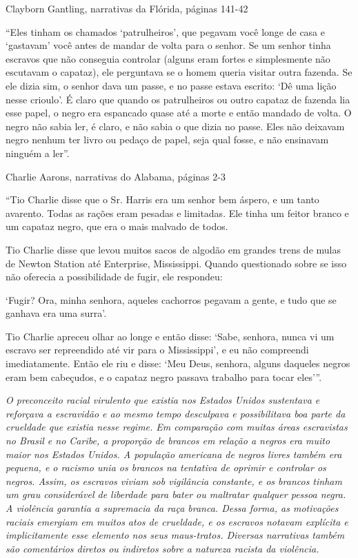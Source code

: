 Clayborn Gantling, narrativas da Flórida, páginas 141-42

``Eles tinham os chamados `patrulheiros', que pegavam você longe de casa
e `gastavam' você antes de mandar de volta para o senhor. Se um senhor
tinha escravos que não conseguia controlar (alguns eram fortes e
simplesmente não escutavam o capataz), ele perguntava se o homem queria
visitar outra fazenda. Se ele dizia sim, o senhor dava um passe, e no
passe estava escrito: `Dê uma lição nesse crioulo'. É claro que quando
os patrulheiros ou outro capataz de fazenda lia esse papel, o negro era
espancado quase até a morte e então mandado de volta. O negro não sabia
ler, é claro, e não sabia o que dizia no passe. Eles não deixavam negro
nenhum ter livro ou pedaço de papel, seja qual fosse, e não ensinavam
ninguém a ler''.

Charlie Aarons, narrativas do Alabama, páginas 2-3

``Tio Charlie disse que o Sr. Harris era um senhor bem áspero, e um
tanto avarento. Todas as rações eram pesadas e limitadas. Ele tinha um
feitor branco e um capataz negro, que era o mais malvado de todos.

Tio Charlie disse que levou muitos sacos de algodão em grandes trens de
mulas de Newton Station até Enterprise, Mississippi. Quando questionado
sobre se isso não oferecia a possibilidade de fugir, ele respondeu:

`Fugir? Ora, minha senhora, aqueles cachorros pegavam a gente, e tudo
que se ganhava era uma surra'.

Tio Charlie apreceu olhar ao longe e então disse: `Sabe, senhora, nunca
vi um escravo ser repreendido até vir para o Mississippi', e eu não
compreendi imediatamente. Então ele riu e disse: `Meu Deus, senhora,
alguns daqueles negros eram bem cabeçudos, e o capataz negro passava
trabalho para tocar eles'''.

\emph{O preconceito racial virulento que existia nos Estados Unidos
sustentava e reforçava a escravidão e ao mesmo tempo desculpava e
possibilitava boa parte da crueldade que existia nesse regime. Em
comparação com muitas áreas escravistas no Brasil e no Caribe, a
proporção de brancos em relação a negros era muito maior nos Estados
Unidos. A população americana de negros livres também era pequena, e o
racismo unia os brancos na tentativa de oprimir e controlar os negros.
Assim, os escravos viviam sob vigilância constante, e os brancos tinham
um grau considerável de liberdade para bater ou maltratar qualquer
pessoa negra. A violência garantia a supremacia da raça branca. Dessa
forma, as motivações raciais emergiam em muitos atos de crueldade, e os
escravos notavam explícita e implicitamente esse elemento nos seus
maus-tratos. Diversas narrativas também são comentários diretos ou
indiretos sobre a natureza racista da violência.}

